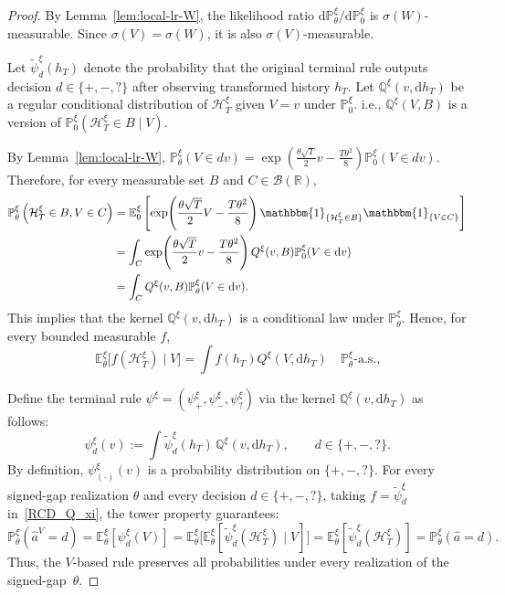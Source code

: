 \documentclass[10pt]{article}
\newcommand{\dd}{\mathrm{d}}
\theoremstyle{plain}
\begin{document}
\begin{proof}
By Lemma~\ref{lem:local-lr-W}, the likelihood ratio $\dd\mathbb{P}_\theta^{\xi}/\dd\mathbb{P}_0^{\xi}$ is   $\sigma(W)$-measurable. Since $\sigma(V)=\sigma(W)$, it is also $\sigma(V)$-measurable.

Let $\tilde{\psi}_d^\xi(h_T)$ denote the probability that the original terminal rule outputs decision $d\in\{+,-,?\}$ after observing transformed history $h_T$. Let $\mathbb{Q}^{\xi}(v,\dd h_T)$ be a regular conditional distribution of $\mathcal{H}_T^{\xi}$ given $V=v$ under $\mathbb{P}_0^{\xi}$. i.e., $\mathbb{Q}^{\xi}(V,B)$ is a version of $\mathbb{P}_0^{\xi}\left( \mathcal{H}_T^{\xi} \in B \mid V \right)$.

By Lemma~\ref{lem:local-lr-W}, $\mathbb{P}^\xi_{\theta}(V \in dv)
=\exp\!\left(\frac{\theta\sqrt{T}}{2}v-\frac{T\theta^2}{8}\right) \mathbb{P}^\xi_{0}(V \in dv)$. Therefore, for every measurable set $B$ and $C \in \mathcal B(\mathbb R)$, $$
\begin{aligned}
    \mathbb{P}_\theta^{\xi}\left(\mathcal{H}_T^{\xi} \in B , V \in C \right) &= \mathbb E^\xi_0 \left[ \exp\!\left(\frac{\theta\sqrt{T}}{2}V-\frac{T\theta^2}{8}\right) \mathbbm{1}_{\{\mathcal{H}_T^{\xi} \in B\}} \mathbbm{1}_{\{V \in C\}} \right] \\
    &= \int_C \exp\!\left(\frac{\theta\sqrt{T}}{2}v-\frac{T\theta^2}{8}\right) Q^\xi(v,B) \mathbb P^\xi_{0}(V \in \dd v) \\
    &= \int_C Q^\xi(v,B) \mathbb P^\xi_{\theta}(V \in \dd v).
\end{aligned}
$$
This implies   that the kernel $\mathbb{Q}^{\xi}(v,\dd h_T)$ is a conditional law under   $\mathbb{P}_\theta^{\xi}$. Hence, for every bounded measurable $f$, 
\begin{equation}\label{RCD_Q_xi}
  \mathbb E^\xi_\theta \big[ f(\mathcal H^\xi_T) \mid V \big]  = \int f(h_T) Q^\xi(V,\dd h_T) \quad \mathbb P^\xi_\theta\text{-a.s.,}
\end{equation}

Define the terminal rule $\psi^\xi = (\psi_+^\xi, \psi_-^\xi, \psi_?^\xi)$ via the kernel  $\mathbb{Q}^{\xi}(v,\dd h_T)$ as follows:
$$ \psi_d^\xi(v) := \int \tilde{\psi}_d^\xi(h_T)\,\mathbb{Q}^{\xi}(v,\dd h_T), \qquad d\in\{+,-,?\}. $$
By definition, $\psi_{(\cdot)}^\xi(v)$ is a probability distribution on $\{+,-,?\}$. For every signed-gap realization $\theta$ and every decision $d \in\{+,-,?\}$, taking $f=\tilde{\psi}_d^\xi$ in~\eqref{RCD_Q_xi}, the tower property guarantees:
$$ \mathbb{P}_\theta^{\xi}(\hat{a}^V=d) = \mathbb{E}_\theta^{\xi}[\psi_d^\xi(V)] = \mathbb{E}_\theta^{\xi}\big[\mathbb{E}_\theta^{\xi}[\tilde{\psi}_d^\xi(\mathcal{H}_T^{\xi})\mid V]\big] = \mathbb{E}_\theta^{\xi}[\tilde{\psi}_d^\xi(\mathcal{H}_T^{\xi})] = \mathbb{P}_\theta^{\xi}(\hat{a}=d). $$
Thus, the  $V$-based rule   preserves all  probabilities under every   realization of the signed-gap~$\theta$.  
\end{proof}
\end{document}
